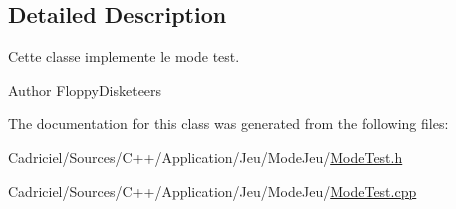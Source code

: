 \subsection{Detailed Description}
Cette classe implemente le mode test. 

\begin{DoxyAuthor}{Author}
Floppy\-Disketeers 
\end{DoxyAuthor}


The documentation for this class was generated from the following files\-:\begin{DoxyCompactItemize}
\item 
Cadriciel/\-Sources/\-C++/\-Application/\-Jeu/\-Mode\-Jeu/\hyperlink{_mode_test_8h}{Mode\-Test.\-h}\item 
Cadriciel/\-Sources/\-C++/\-Application/\-Jeu/\-Mode\-Jeu/\hyperlink{_mode_test_8cpp}{Mode\-Test.\-cpp}\end{DoxyCompactItemize}
